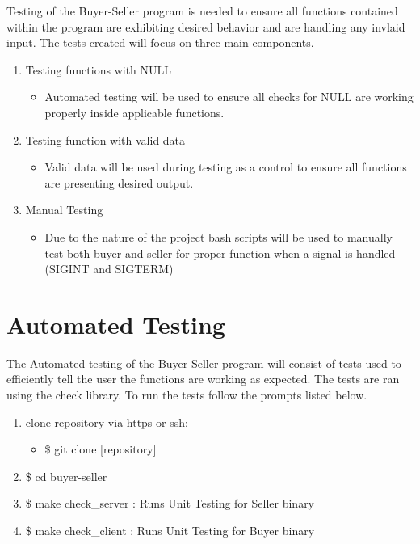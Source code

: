 \documentclass{article}
\begin{document}
\noindent Testing of the Buyer-Seller program is needed to ensure all functions contained within the program are exhibiting desired behavior and are handling any invlaid input. The tests created will focus on three main components.
\begin{enumerate}
 \item Testing functions with NULL
 \begin{itemize} 
  \item Automated testing will be used to ensure all checks for NULL are working properly inside applicable functions.
 \end{itemize}
 \item Testing function with valid data
 \begin{itemize} 
  \item Valid data will be used during testing as a control to ensure all functions are presenting desired output.
 \end{itemize}
 \item Manual Testing
 \begin{itemize} 
  \item Due to the nature of the project bash scripts will be used to manually test both buyer and seller for proper function when a signal is handled (SIGINT and SIGTERM)
 \end{itemize}
 
\end{enumerate}
 
\section{Automated Testing}

The  Automated testing of the Buyer-Seller program will consist of tests used to efficiently tell the user the functions are working as expected. The tests are ran using the check library. To run the tests follow the prompts listed below.

\begin{enumerate}
 \item clone repository via https or ssh: 
 \begin{itemize}
  \item \$ git clone [repository]
 \end{itemize}
 \item \$ cd buyer-seller
 \item \$ make check_server : Runs Unit Testing for Seller binary
 \item \$ make check_client : Runs Unit Testing for Buyer binary
\end{enumerate}
\end{document}
